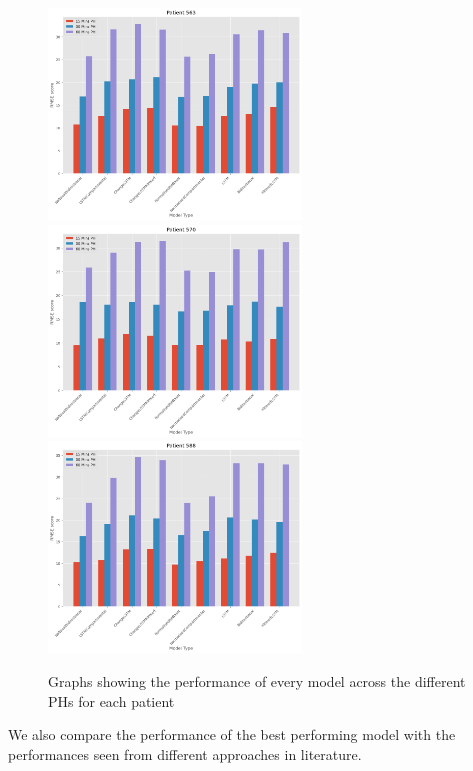       \begin{figure}[H]
        \centering
  
        \includegraphics[width=0.6\textwidth]{images/563Perf.png}
        \includegraphics[width=0.6\textwidth]{images/570Perf.png}
        \includegraphics[width=0.6\textwidth]{images/588Perf.png}
        \caption{
         Graphs showing the performance of every model across the different PHs for each patient
        }
      \end{figure}

      We also compare the performance of the best performing model with the performances seen from different approaches in literature.

